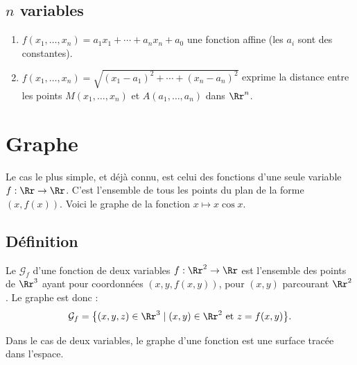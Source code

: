 \subsection{$n$ variables}

\begin{exemple}{}{}
	
	\begin{enumerate}
		\item $f(x_1,\ldots,x_n) = a_1x_1+\cdots+a_nx_n+a_0$ une fonction affine (les $a_i$ sont des constantes).
		\item $f(x_1,\ldots,x_n) = \sqrt{(x_1-a_1)^2+\cdots+(x_n-a_n)^2}$ exprime la distance entre les points $M(x_1,\ldots,x_n)$ et $A(a_1,\ldots,a_n)$ dans $\Rr^n$.
	\end{enumerate}
\end{exemple}


\section{Graphe}

Le cas le plus simple, et déjà connu, est celui des fonctions d'une seule variable $f : \Rr \rightarrow \Rr$.  C'est l'ensemble de tous les points du plan de la forme $(x,f(x))$. Voici le graphe de la fonction $x \mapsto x\cos x$.




\subsection{Définition}

\begin{definition}{}{}
	Le  $\mathcal{G}_f$ d'une fonction de deux variables $f : \Rr^2 \to \Rr$ est  l'ensemble des points de $\Rr^3$ ayant pour coordonnées $(x,y,f(x,y))$, pour $(x,y)$ parcourant $\Rr^2$. Le graphe est donc :
	$$\mathcal{G}_f= \big\{ (x,y,z) \in \Rr^3 \mid (x,y)\in \Rr^2 \text{ et } z=f(x,y)\big\}.$$
\end{definition}

Dans le cas de deux variables, le graphe d'une fonction est une surface tracée dans l'espace.




